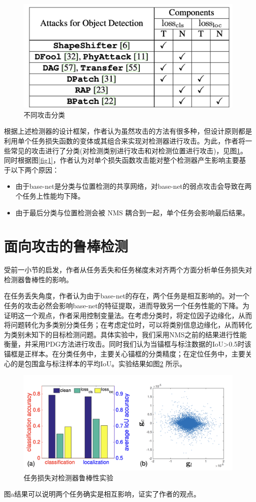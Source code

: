 \documentclass[conference,10pt]{IEEEtran}
\begin{document}
\begin{figure}[H]
	\centering
	\includegraphics[scale=0.3]{figure/fig2.png}
	\caption{不同攻击分类}
	\label{fig2}
\end{figure}
根据上述检测器的设计框架，作者认为虽然攻击的方法有很多种，但设计原则都是利用单个任务损失函数的变体或其组合来实现对检测器进行攻击。为此，作者将一些常见的攻击进行了分类(对检测类别进行攻击和对检测位置进行攻击)，见图\ref{fig2}。同时根据图\ref{fig1}，作者认为对单个损失函数攻击能对整个检测器产生影响主要基于以下两个原因：
\begin{itemize}
	\item 由于base-net是分类与位置检测的共享网络，对base-net的弱点攻击会导致在两个任务上性能均下降。
	\item 由于最后分类与位置检测会被 NMS 耦合到一起，单个任务会影响最后结果。
\end{itemize}

\section{面向攻击的鲁棒检测}
受前一小节的启发，作者从任务丢失和任务梯度未对齐两个方面分析单任务损失对检测器鲁棒性的影响。

在任务丢失角度，作者认为由于base-net的存在，两个任务是相互影响的。对一个任务的攻击必然会影响base-net的特征提取，进而导致另一个任务性能的下降。为证明这一个观点，作者采用控制变量法。在考虑分类时，将定位因子边缘化，从而将问题转化为多类别分类任务；在考虑定位时，可以将类别信息边缘化，从而转化为类别未知下的目标检测问题。具体实验中，我们采用NMS之前的结果进行性能衡量，并采用PDG方法进行攻击。同时我们认为当锚框与标注数据的IoU>0.5时该锚框是正样本。在分类任务中，主要关心锚框的分类精度；在定位任务中，主要关心的是包围盒与标注样本的平均IoU。实验结果如图\ref{fig3} 所示。
\begin{figure}
	\centering
	\includegraphics[scale=0.3]{figure/fig3.png}
	\caption{任务损失对检测器鲁棒性实验}
	\label{fig3}
\end{figure}
图a结果可以说明两个任务确实是相互影响，证实了作者的观点。
\end{document}

